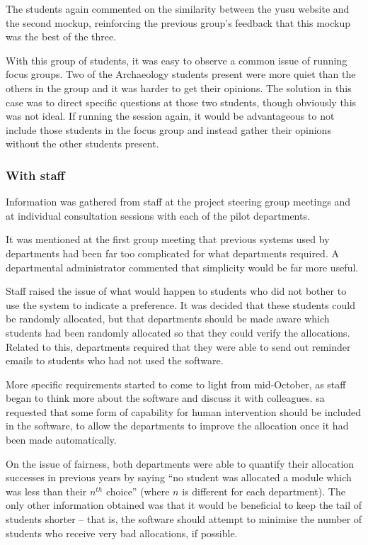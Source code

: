The students again commented on the similarity between the \gls{yusu} website
and the second mockup, reinforcing the previous group's feedback that this
mockup was the best of the three.

With this group of students, it was easy to observe a common issue of running
focus groups. Two of the Archaeology students present were more quiet than the
others in the group and it was harder to get their opinions. The solution in
this case was to direct specific questions at those two students, though
obviously this was not ideal. If running the session again, it would be
advantageous to not include those students in the focus group and instead
gather their opinions without the other students present.

\subsubsection{With staff}

Information was gathered from staff at the project steering group meetings and
at individual consultation sessions with each of the pilot departments.

It was mentioned at the first group meeting that previous systems used by
departments had been far too complicated for what departments required. A
departmental administrator commented that simplicity would be far more useful.

Staff raised the issue of what would happen to students who did not bother to
use the system to indicate a preference. It was decided that these students
could be randomly allocated, but that departments should be made aware which
students had been randomly allocated so that they could verify the
allocations. Related to this, departments required that they were able to send
out reminder emails to students who had not used the software.

More specific requirements started to come to light from mid-October, as staff
began to think more about the software and discuss it with colleagues.
\gls{sa} requested that some form of capability for human intervention should
be included in the software, to allow the departments to improve the allocation
once it had been made automatically.

On the issue of fairness, both departments were able to quantify their
allocation successes in previous years by saying ``no student was allocated a
module which was less than their $n^{th}$ choice'' (where $n$ is different for
each department). The only other information obtained was that it would be
beneficial to keep the tail of students shorter -- that is, the software should attempt
to minimise the number of students who receive very bad allocations, if
possible.

